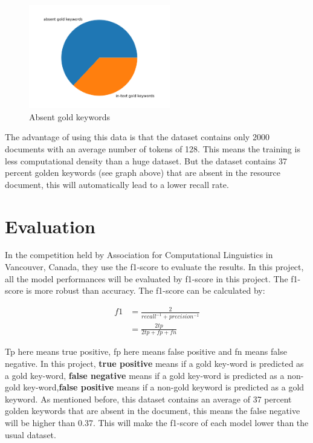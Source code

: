 \documentclass[11pt]{article}
\begin{document}
   \begin{figure}[H] %
\centering %
\includegraphics[width=0.55\textwidth]{pic/pie.png} %
\caption{Absent gold keywords} %
\label{Fig.main6} %
\end{figure}
   \noindent
  The advantage of using this data is that the dataset contains only 2000 documents with an average number of tokens of 128. This means the training is less computational density than a huge dataset. But the dataset contains 37 percent golden keywords (see graph above) that are absent in the resource document, this will automatically lead to a lower recall rate.
  
  \section{Evaluation}
  In the competition \cite{augenstein-etal-2017-semeval} held by Association for Computational Linguistics in Vancouver, Canada,
  they use the f1-score to evaluate the results. In this project, all the model performances will be evaluated by f1-score in this project. The f1-score is more robust than accuracy.
  The f1-score can be calculated by:
  
  \begin{equation}
    \begin{aligned}
      f1 &= \frac{2}{recall^{-1}+precision^{-1}} \\
      &= \frac{2tp}{2tp+fp+fn}
      \end{aligned}
  \end{equation}

  \noindent
  Tp here means true positive, fp here means false positive and fn means false negative. In this project, \textbf{true positive} means if a gold key-word is predicted as a gold key-word,
  \textbf{false negative} means if a gold key-word is predicted as a non-gold key-word,\textbf{false positive}
  means if a non-gold keyword is predicted as a gold keyword.
  As mentioned before, this dataset contains an average of 37 percent golden keywords that are absent in the document, this means the false negative will be higher than 0.37. This will make the f1-score of each model lower than the usual dataset.
\end{document}
